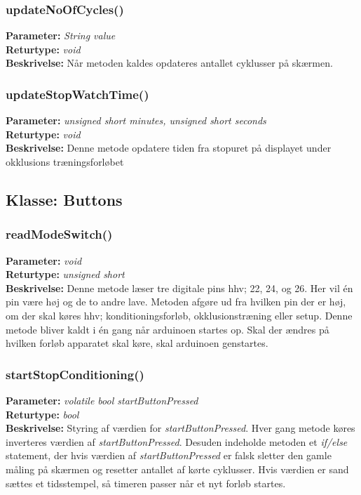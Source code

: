 \subsubsection{updateNoOfCycles()}
\textbf{Parameter: } \textit{String value}
\\ \textbf{Returtype: } \textit{void}
\\ \textbf{Beskrivelse: } Når metoden kaldes opdateres antallet cyklusser på skærmen. 

\subsubsection{updateStopWatchTime()}
\textbf{Parameter: } \textit{unsigned short minutes, unsigned short seconds}
\\ \textbf{Returtype: } \textit{void}
\\ \textbf{Beskrivelse: } Denne metode opdatere tiden fra stopuret på displayet under okklusions træningsforløbet 

\subsection{Klasse: Buttons}

\subsubsection{readModeSwitch()}
\textbf{Parameter: } \textit{void}
\\ \textbf{Returtype: } \textit{unsigned short}
\\ \textbf{Beskrivelse: } Denne metode læser tre digitale pins hhv; 22, 24, og 26. Her vil én pin være høj og de to andre lave. Metoden afgøre ud fra hvilken pin der er høj, om der skal køres hhv; konditioningsforløb, okklusionstræning eller setup. Denne metode bliver kaldt i én gang når arduinoen startes op. Skal der ændres på hvilken forløb apparatet skal køre, skal arduinoen genstartes. 

\subsubsection{startStopConditioning()}
\textbf{Parameter: } \textit{volatile bool startButtonPressed}
\\ \textbf{Returtype: } \textit{bool}
\\ \textbf{Beskrivelse: } Styring af værdien for \textit{startButtonPressed}. Hver gang metode køres inverteres værdien af \textit{startButtonPressed}. Desuden indeholde metoden et \textit{if/else} statement, der hvis værdien af \textit{startButtonPressed} er falsk sletter den gamle måling på skærmen og resetter antallet af kørte cyklusser. Hvis værdien er sand sættes et tidsstempel, så timeren passer når et nyt forløb startes.  

